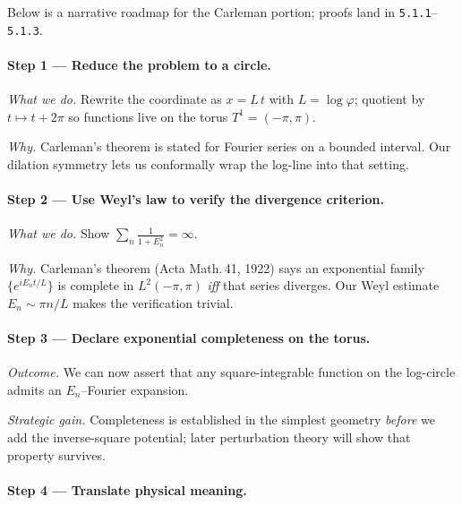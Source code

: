 \documentclass[11pt]{article}
\begin{document}
Below is a narrative roadmap for the Carleman portion; proofs land in
\texttt{5.1.1}–\texttt{5.1.3}.

\vspace{0.6em}
\paragraph{Step 1 — Reduce the problem to a circle.}

\emph{What we do.}  
Rewrite the coordinate as \(x=L\,t\) with \(L=\log\varphi\); quotient
by \(t\mapsto t+2\pi\) so functions live on the torus
\(T^{1}=(-\pi,\pi)\).

\emph{Why.}  
Carleman’s theorem is stated for Fourier series on a bounded interval.
Our dilation symmetry lets us conformally wrap the log-line into that
setting.

\vspace{0.4em}
\paragraph{Step 2 — Use Weyl’s law to verify the divergence criterion.}

\emph{What we do.}  
Show  
\(
   \displaystyle\sum_{n}\frac{1}{1+E_{n}^{2}}=\infty.
\)

\emph{Why.}  
Carleman’s theorem (Acta Math.\,41, 1922) says an exponential family
\(\{e^{iE_{n}t/L}\}\) is complete in \(L^{2}(-\pi,\pi)\)
\emph{iff} that series diverges.  
Our Weyl estimate \(E_{n}\sim\pi n/L\) makes the verification trivial.

\vspace{0.4em}
\paragraph{Step 3 — Declare exponential completeness on the torus.}

\emph{Outcome.}  
We can now assert that any square-integrable function on the
log-circle admits an \(E_{n}\)–Fourier expansion.

\emph{Strategic gain.}  
Completeness is established in the simplest geometry \emph{before} we
add the inverse-square potential; later perturbation theory will show
that property survives.

\vspace{0.4em}
\paragraph{Step 4 — Translate physical meaning.}
\end{document}
